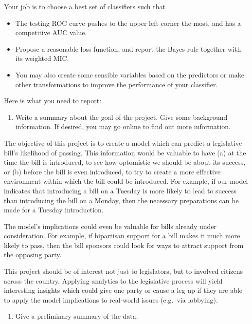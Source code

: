 \documentclass[]{article}
\providecommand{\tightlist}{%
  \setlength{\itemsep}{0pt}\setlength{\parskip}{0pt}}
\begin{document}
Your job is to choose a best set of classifiers such that

\begin{itemize}
\tightlist
\item
  The testing ROC curve pushes to the upper left corner the most, and
  has a competitive AUC value.
\item
  Propose a reasonable loss function, and report the Bayes rule together
  with its weighted MIC.
\item
  You may also create some sensible variables based on the predictors or
  make other transformations to improve the performance of your
  classifier.
\end{itemize}

Here is what you need to report:

\begin{enumerate}
\def\labelenumi{\arabic{enumi}.}
\tightlist
\item
  Write a summary about the goal of the project. Give some background
  information. If desired, you may go online to find out more
  information.
\end{enumerate}

The objective of this project is to create a model which can predict a
legislative bill's likelihood of passing. This information would be
valuable to have (a) at the time the bill is introduced, to see how
optomistic we should be about its success, or (b) before the bill is
even introduced, to try to create a more effective environment within
which the bill could be introduced. For example, if our model indicates
that introducing a bill on a Tuesday is more likely to lead to success
than introducing the bill on a Monday, then the necessary preparations
can be made for a Tuesday introduction.

The model's implications could even be valuable for bills already under
consideration. For example, if bipartisan support for a bill makes it
much more likely to pass, then the bill sponsors could look for ways to
attract support from the opposing party.

This project should be of interest not just to legislators, but to
involved citizens across the country. Applying analytics to the
legislative process will yield interesting insights which could give one
party or cause a leg up if they are able to apply the model implications
to real-world issues (e.g.~via lobbying).

\begin{enumerate}
\def\labelenumi{\arabic{enumi}.}
\setcounter{enumi}{1}
\tightlist
\item
  Give a preliminary summary of the data.
\end{enumerate}
\end{document}
